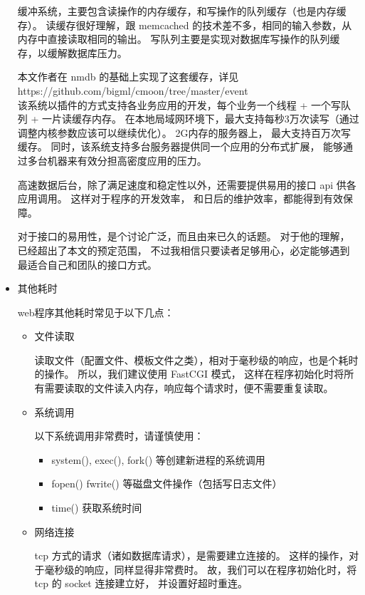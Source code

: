 \documentclass{article}
\begin{document}
\begin{itemize}
    缓冲系统，主要包含读操作的内存缓存，和写操作的队列缓存（也是内存缓存）。
    读缓存很好理解，跟 memcached 的技术差不多，相同的输入参数，从内存中直接读取相同的输出。
    写队列主要是实现对数据库写操作的队列缓存，以缓解数据库压力。

    本文作者在 nmdb 的基础上实现了这套缓存，详见 \\
    https://github.com/bigml/cmoon/tree/master/event \\
    该系统以插件的方式支持各业务应用的开发，每个业务一个线程 + 一个写队列 + 一片读缓存内存。
    在本地局域网环境下，最大支持每秒3万次读写（通过调整内核参数应该可以继续优化）。 2G内存的服务器上，
    最大支持百万次写缓存。 同时，该系统支持多台服务器提供同一个应用的分布式扩展，
    能够通过多台机器来有效分担高密度应用的压力。

    高速数据后台，除了满足速度和稳定性以外，还需要提供易用的接口 api 供各应用调用。 这样对于程序的开发效率，
    和日后的维护效率，都能得到有效保障。

    对于接口的易用性，是个讨论广泛，而且由来已久的话题。 对于他的理解，已经超出了本文的预定范围，
    不过我相信只要读者足够用心，必定能够遇到最适合自己和团队的接口方式。

  \item 其他耗时

    web程序其他耗时常见于以下几点：

    \begin{itemize}
    \item 文件读取

      读取文件（配置文件、模板文件之类），相对于毫秒级的响应，也是个耗时的操作。 所以，我们建议使用 FastCGI 模式，
      这样在程序初始化时将所有需要读取的文件读入内存，响应每个请求时，便不需要重复读取。

    \item 系统调用

      以下系统调用非常费时，请谨慎使用：

      \begin{itemize}
      \item system(), exec(), fork() 等创建新进程的系统调用
      \item fopen() fwrite() 等磁盘文件操作（包括写日志文件）
      \item time() 获取系统时间
      \end{itemize}
      
    \item 网络连接

      tcp 方式的请求（诸如数据库请求），是需要建立连接的。 这样的操作，对于毫秒级的响应，同样显得非常费时。
      故，我们可以在程序初始化时，将 tcp 的 socket 连接建立好， 并设置好超时重连。
    \end{itemize}
  \end{itemize}
\end{document}
